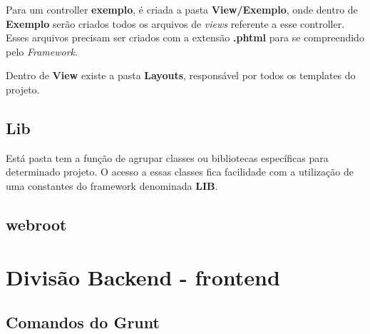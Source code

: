             Para um controller \textbf{exemplo}, é criada a pasta \textbf{View/Exemplo}, onde dentro de \textbf{Exemplo} serão criados todos os arquivos de \emph{views} referente a esse controller. Esses arquivos precisam ser criados com a extensão \textbf{.phtml} para se compreendido pelo \emph{Framework}.

            Dentro de \textbf{View} existe a pasta \textbf{Layouts}, responsável por todos os templates do projeto.

        \subsection{Lib\label{sec:app-lib}}

            Está pasta tem a função de agrupar classes ou bibliotecas específicas para determinado projeto. O acesso a essas classes fica facilidade com a utilização de uma constantes do framework denominada \textbf{LIB}.

        \subsection{webroot\label{sec:app-lib}}




    \section{Divisão Backend - frontend\label{sec:back-front}}


        \subsection{Comandos do Grunt\label{sub:comandos-grunt}}
